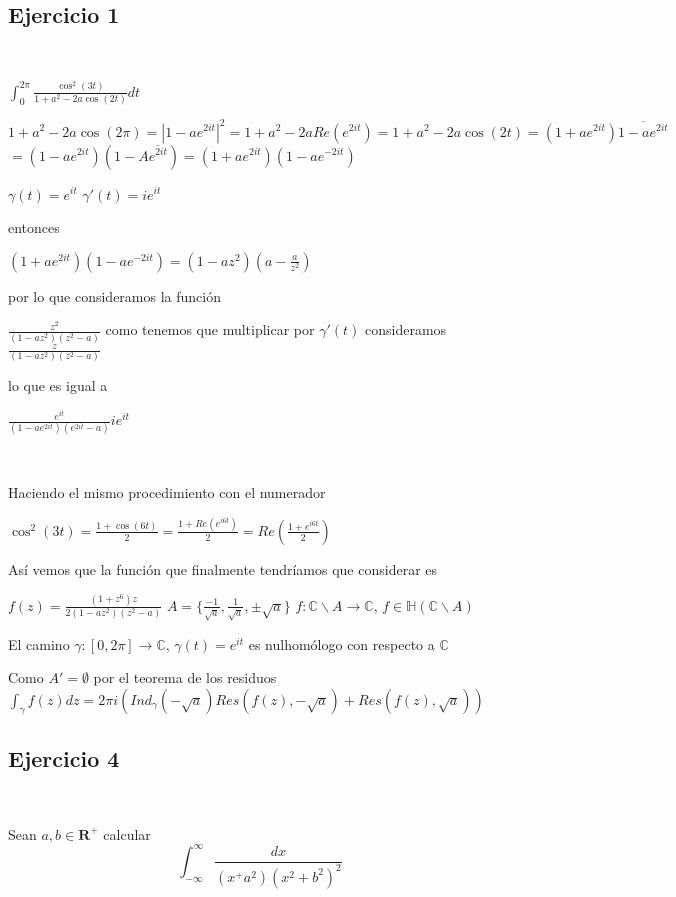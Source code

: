 \subsection{Ejercicio 1}

\

$\int_{0}^{2\pi} \frac{\cos^2(3t)}{1+a^2-2a\cos(2t)} dt$

$1+a^2-2a\cos(2\pi) = |1-ae^{2it}|^2 = 1+a^2-2aRe(e^{2it}) =  1+a^2-2a\cos(2t) = (1+ae^{2it})\overline{1-ae^{2it}}$
$= (1-ae^{2it})(1-A\overline{e^{2it}}) = (1+ae^{2it})(1-ae^{-2it})$

$\gamma(t) = e^{it}$
$\gamma'(t) = ie^{it}$

entonces

$(1+ae^{2it})(1-ae^{-2it}) = (1-az^2)(a-\frac{a}{z^2})$

por lo que consideramos la función 

$\frac{z^2}{(1-az^2)(z^2-a)}$ 
como tenemos que multiplicar por $\gamma'(t)$ consideramos $\frac{z}{(1-az^2)(z^2-a)}$

lo que es igual a

$\frac{e^{it}}{(1-ae^{2it})(e^{2it}-a)} ie^{it}$

\

Haciendo el mismo procedimiento con el numerador

$\cos^2(3t) = \frac{1+\cos(6t)}{2} = \frac{1+Re(e^{i6t})}{2} = Re(\frac{1+e^{i6t}}{2})$


Así vemos que la función que finalmente tendríamos que considerar es

$f(z) = \frac{(1+z^6)z}{2(1-az^2)(z^2-a)}$
$A = \{ \frac{-1}{\sqrt{a}}, \frac{1}{\sqrt{a}}, \pm\sqrt{a} \}$
$f:\mathbb{C}\backslash A \rightarrow \mathbb{C}$, $f\in\mathbb{H}(\mathbb{C}\backslash A)$

El camino $\gamma:[0,2\pi] \rightarrow \mathbb{C}$, $\gamma(t) = e^{it}$ es nulhomólogo con respecto a $\mathbb{C}$

Como $A' = \emptyset$ por el teorema de los residuos
$\int_{\gamma} f(z)dz = 2\pi i \left( Ind_{\gamma}(-\sqrt{a})Res(f(z),-\sqrt{a}) + Res(f(z), \sqrt{a}) \right)$



\subsection{Ejercicio 4}

\

Sean $a,b\in\mathbf{R}^+$ calcular
$$ \int_{-\infty}^{\infty} \frac{dx}{(x^+a^2)(x^2+b^2)^2} $$


